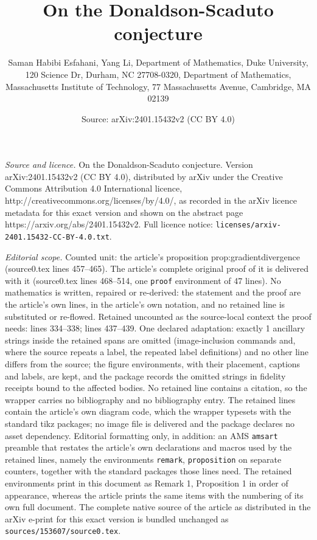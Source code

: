 \documentclass[10pt,a4paper]{amsart}
\title{On the Donaldson-Scaduto conjecture}
\author{Saman Habibi Esfahani, Yang Li, Department of Mathematics, Duke University, 120 Science Dr, Durham, NC 27708-0320, Department of Mathematics, Massachusetts Institute of Technology, 77 Massachusetts Avenue, Cambridge, MA 02139}
\date{Source: arXiv:2401.15432v2 (CC BY 4.0)}
\begin{document}
\maketitle

\noindent\emph{Source and licence.} On the Donaldson-Scaduto conjecture. Version arXiv:2401.15432v2 (CC BY 4.0), distributed by arXiv under the Creative Commons Attribution 4.0 International licence, http://creativecommons.org/licenses/by/4.0/, as recorded in the arXiv licence metadata for this exact version and shown on the abstract page https://arxiv.org/abs/2401.15432v2. Full licence notice: \texttt{licenses/arxiv-2401.15432-CC-BY-4.0.txt}.\par\smallskip

\noindent\textit{Editorial scope.} Counted unit: the article's proposition prop:gradientdivergence (source0.tex lines 457--465). The article's complete original proof of it is delivered with it (source0.tex lines 468--514, one \texttt{proof} environment of 47 lines). No mathematics is written, repaired or re-derived: the statement and the proof are the article's own lines, in the article's own notation, and no retained line is substituted or re-flowed.  Retained uncounted as the source-local context the proof needs: lines 334--338; lines 437--439.  One declared adaptation: exactly 1 ancillary strings inside the retained spans are omitted (image-inclusion commands and, where the source repeats a label, the repeated label definitions) and no other line differs from the source; the figure environments, with their placement, captions and labels, are kept, and the package records the omitted strings in fidelity receipts bound to the affected bodies.  No retained line contains a citation, so the wrapper carries no bibliography and no bibliography entry.  The retained lines contain the article's own diagram code, which the wrapper typesets with the standard tikz packages; no image file is delivered and the package declares no asset dependency.  Editorial formatting only, in addition: an AMS \texttt{amsart} preamble that restates the article's own declarations and macros used by the retained lines, namely the environments \texttt{remark}, \texttt{proposition} on separate counters, together with the standard packages those lines need.  The retained environments print in this document as Remark 1, Proposition 1 in order of appearance, whereas the article prints the same items with the numbering of its own full document.  The complete native source of the article as distributed in the arXiv e-print for this exact version is bundled unchanged as \texttt{sources/153607/source0.tex}.
\end{document}
